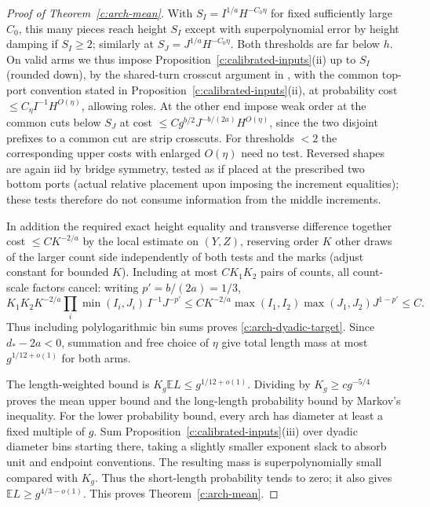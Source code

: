 \begin{proof}[Proof of Theorem~\ref{c:arch-mean}]
With \(S_I=I^{1/a}H^{-C_0\eta}\) for fixed sufficiently large \(C_0\), this many pieces reach height \(S_I\) except with superpolynomial error by height damping if \(S_I\ge2\); similarly at \(S_J=J^{1/a}H^{-C_0\eta}\). Both thresholds are far below \(h\). On valid arms we thus impose Proposition~\ref{c:calibrated-inputs}(ii) up to \(S_I\) (rounded down), by the shared-turn crosscut argument in \cite[Section 7.3]{Renewal}, with the common top-port convention stated in Proposition~\ref{c:calibrated-inputs}(ii), at probability cost \(\le C_\eta I^{-1}H^{O(\eta)}\), allowing roles. At the other end impose weak order at the common cuts below \(S_J\) at cost \(\le C g^{b/2}J^{-b/(2a)}H^{O(\eta)}\), since the two disjoint prefixes to a common cut are strip crosscuts. For thresholds \(<2\) the corresponding upper costs with enlarged \(O(\eta)\) need no test. Reversed shapes are again iid by bridge symmetry, tested as if placed at the prescribed two bottom ports (actual relative placement upon imposing the increment equalities); these tests therefore do not consume information from the middle increments.



In addition the required exact height equality and transverse difference together cost \(\le C K^{-2/a}\) by the local estimate on \((Y,Z)\), reserving order \(K\) other draws of the larger count side independently of both tests and the marks (adjust constant for bounded \(K\)). Including at most \(C K_1 K_2\) pairs of counts, all count-scale factors cancel: writing \(p'=b/(2a)=1/3\),
\[
 K_1K_2 K^{-2/a}\prod_i\min(I_i,J_i)\, I^{-1}J^{-p'}
 \le C K^{-2/a}\max(I_1,I_2)\max(J_1,J_2)J^{1-p'}
 \le C.
\]
Thus including polylogarithmic bin sums proves \eqref{c:arch-dyadic-target}.
Since $d_*-2a<0$, summation and free choice of $\eta$ give total length
mass at most $g^{1/12+o(1)}$ for both arms.

The length-weighted bound is $K_g\mathbb E L\le g^{1/12+o(1)}$.
Dividing by $K_g\ge cg^{-5/4}$ proves the mean upper bound and the
long-length probability bound by Markov's inequality. For the lower
probability bound, every arch has diameter at least a fixed multiple of
$g$. Sum Proposition~\ref{c:calibrated-inputs}(iii) over dyadic diameter
bins starting there, taking a slightly smaller exponent slack to absorb
unit and endpoint conventions. The resulting mass is superpolynomially
small compared with $K_g$. Thus the short-length probability tends to
zero; it also gives $\mathbb E L\ge g^{4/3-o(1)}$. This proves
Theorem~\ref{c:arch-mean}.
\end{proof}


